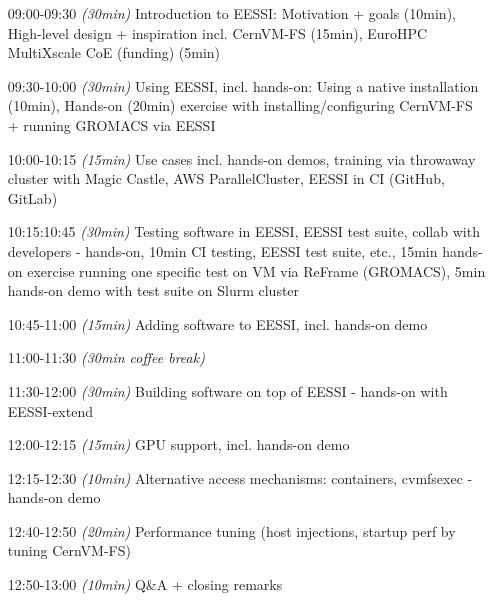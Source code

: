 \begin{itemize}[style=standard, labelwidth=1.9cm]


    \item [09:00-09:30] \emph{(30min)} Introduction to EESSI: Motivation + goals (10min), High-level design + inspiration incl. CernVM-FS (15min), EuroHPC MultiXscale CoE (funding) (5min)
    \item [09:30-10:00] \emph{(30min)} Using EESSI, incl. hands-on: Using a native installation (10min), Hands-on (20min) exercise with installing/configuring CernVM-FS + running GROMACS via EESSI
    \item [10:00-10:15] \emph{(15min)} Use cases incl. hands-on demos, training via throwaway cluster with Magic Castle, AWS ParallelCluster, EESSI in CI (GitHub, GitLab)
    \item [10:15:10:45] \emph{(30min)} Testing software in EESSI, EESSI test suite, collab with developers - hands-on, 10min CI testing, EESSI test suite, etc., 15min hands-on exercise running one specific test on VM via ReFrame (GROMACS), 5min hands-on demo with test suite on Slurm cluster
    \item [10:45-11:00] \emph{(15min)} Adding software to EESSI, incl. hands-on demo
    \item [11:00-11:30] \emph{(30min coffee break)}
    \item [11:30-12:00] \emph{(30min)} Building software on top of EESSI - hands-on with EESSI-extend
    \item [12:00-12:15] \emph{(15min)} GPU support, incl. hands-on demo
    \item [12:15-12:30] \emph{(10min)} Alternative access mechanisms: containers, cvmfsexec - hands-on demo
    \item [12:40-12:50] \emph{(20min)} Performance tuning (host injections, startup perf by tuning CernVM-FS)
    \item [12:50-13:00] \emph{(10min)} Q\&A + closing remarks

\end{itemize}

